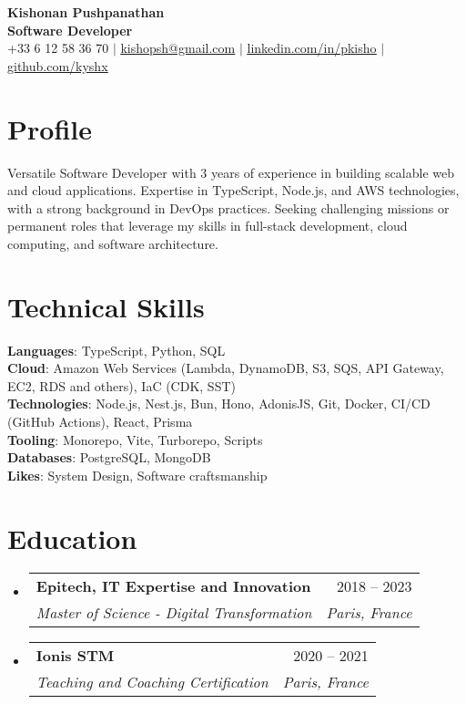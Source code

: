 \documentclass[letterpaper,11pt]{article}
\makeatletter
\newcommand{\resumeSubheading}[4]{
  \vspace{-2pt}\item
    \begin{tabular*}{0.97\textwidth}[t]{l@{\extracolsep{\fill}}r}
      \textbf{#1} & #2 \\
      \textit{\small#3} & \textit{\small #4} \\
    \end{tabular*}\vspace{-7pt}
}
\newcommand{\resumeSubHeadingListStart}{\begin{itemize}[leftmargin=0.15in, label={}]}
\newcommand{\resumeSubHeadingListEnd}{\end{itemize}}
\makeatother
\begin{document}
\begin{center}
    \textbf{\LARGE Kishonan Pushpanathan} \\ \vspace{3pt}
    \textbf{\large Software Developer} \\ \vspace{10pt}
    \small +33 6 12 58 36 70 $|$ \href{mailto:kishopsh@gmail.com}{\underline{kishopsh@gmail.com}} $|$
    \href{https://linkedin.com/in/pkisho}{\underline{linkedin.com/in/pkisho}} $|$
    \href{https://github.com/kyshx}{\underline{github.com/kyshx}}
\end{center}

\section{Profile}
\small{
Versatile Software Developer with 3 years of experience in building scalable web and cloud applications. Expertise in TypeScript, Node.js, and AWS technologies, with a strong background in DevOps practices. 
Seeking challenging missions or permanent roles that leverage my skills in full-stack development, cloud computing, and software architecture. 
}

\section{Technical Skills}
\begin{itemize}[leftmargin=0.15in, label={}]
  \small{\item{
   \textbf{Languages}{: TypeScript, Python, SQL} \\
   \textbf{Cloud}{: Amazon Web Services (Lambda, DynamoDB, S3, SQS, API Gateway, EC2, RDS and others), IaC (CDK, SST)} \\
   \textbf{Technologies}{: Node.js, Nest.js, Bun, Hono, AdonisJS, Git, Docker, CI/CD (GitHub Actions), React, Prisma} \\
   \textbf{Tooling}{: Monorepo, Vite, Turborepo, Scripts} \\
   \textbf{Databases}{: PostgreSQL, MongoDB} \\
   \textbf{Likes}{: System Design, Software craftsmanship} \\
   
  }}
\end{itemize}

\section{Education}
  \resumeSubHeadingListStart
    \resumeSubheading
      {Epitech, IT Expertise and Innovation}{2018 -- 2023}
      {Master of Science - Digital Transformation}{Paris, France}
    \resumeSubheading
      {Ionis STM}{2020 -- 2021}
      {Teaching and Coaching Certification}{Paris, France}
  \resumeSubHeadingListEnd
\end{document}
